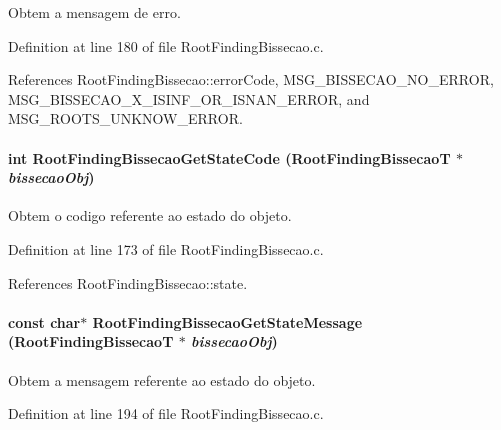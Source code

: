 Obtem a mensagem de erro. 



Definition at line 180 of file RootFindingBissecao.c.

References RootFindingBissecao::errorCode, MSG\_\-BISSECAO\_\-NO\_\-ERROR, MSG\_\-BISSECAO\_\-X\_\-ISINF\_\-OR\_\-ISNAN\_\-ERROR, and MSG\_\-ROOTS\_\-UNKNOW\_\-ERROR.\hypertarget{group____bissecao_g2ab4fb7daf5901001d011ee85dc4cfe0}{
\paragraph[RootFindingBissecaoGetStateCode]{\setlength{\rightskip}{0pt plus 5cm}int RootFindingBissecaoGetStateCode ({\bf RootFindingBissecaoT} $\ast$ {\em bissecaoObj})}\hfill}
\label{group____bissecao_g2ab4fb7daf5901001d011ee85dc4cfe0}


Obtem o codigo referente ao estado do objeto. 



Definition at line 173 of file RootFindingBissecao.c.

References RootFindingBissecao::state.\hypertarget{group____bissecao_gb0455a1f4f30b2e8916d9dff5c237be1}{
\paragraph[RootFindingBissecaoGetStateMessage]{\setlength{\rightskip}{0pt plus 5cm}const char$\ast$ RootFindingBissecaoGetStateMessage ({\bf RootFindingBissecaoT} $\ast$ {\em bissecaoObj})}\hfill}
\label{group____bissecao_gb0455a1f4f30b2e8916d9dff5c237be1}


Obtem a mensagem referente ao estado do objeto. 



Definition at line 194 of file RootFindingBissecao.c.

